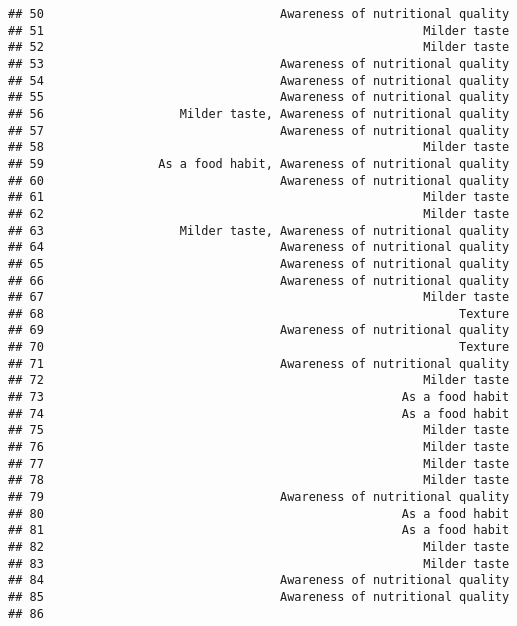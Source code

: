 \documentclass[
]{article}
\begin{document}
\begin{verbatim}
## 50                                 Awareness of nutritional quality
## 51                                                     Milder taste
## 52                                                     Milder taste
## 53                                 Awareness of nutritional quality
## 54                                 Awareness of nutritional quality
## 55                                 Awareness of nutritional quality
## 56                   Milder taste, Awareness of nutritional quality
## 57                                 Awareness of nutritional quality
## 58                                                     Milder taste
## 59                As a food habit, Awareness of nutritional quality
## 60                                 Awareness of nutritional quality
## 61                                                     Milder taste
## 62                                                     Milder taste
## 63                   Milder taste, Awareness of nutritional quality
## 64                                 Awareness of nutritional quality
## 65                                 Awareness of nutritional quality
## 66                                 Awareness of nutritional quality
## 67                                                     Milder taste
## 68                                                          Texture
## 69                                 Awareness of nutritional quality
## 70                                                          Texture
## 71                                 Awareness of nutritional quality
## 72                                                     Milder taste
## 73                                                  As a food habit
## 74                                                  As a food habit
## 75                                                     Milder taste
## 76                                                     Milder taste
## 77                                                     Milder taste
## 78                                                     Milder taste
## 79                                 Awareness of nutritional quality
## 80                                                  As a food habit
## 81                                                  As a food habit
## 82                                                     Milder taste
## 83                                                     Milder taste
## 84                                 Awareness of nutritional quality
## 85                                 Awareness of nutritional quality
## 86                                                                 

\end{verbatim}
\end{document}
